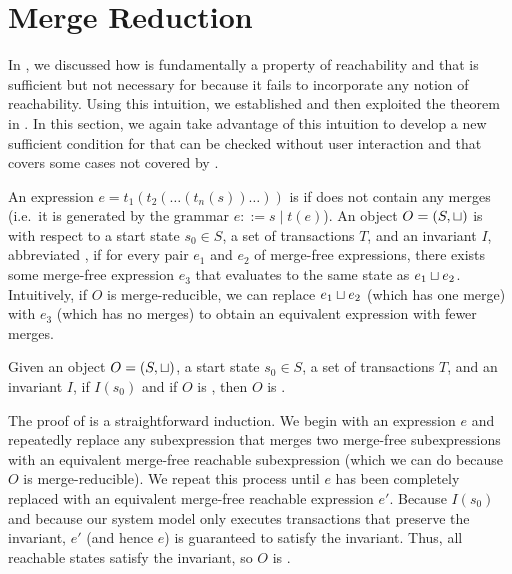\section{Merge Reduction}
In , we discussed how \invariantclosure{} is
fundamentally a property of reachability and that \invariantclosure{} is
sufficient but not necessary for \invariantconfluence{} because it fails to
incorporate any notion of reachability. Using this intuition, we established
 and then exploited the theorem in
. In this section, we again take
advantage of this intuition to develop a new sufficient condition for
\invariantconfluence{} that can be checked without user interaction and that
covers some cases not covered by \invariantclosure{}.

An expression $e = t_1(t_2(\ldots(t_n(s))\ldots))$ is  if
does not contain any merges (i.e.\ it is generated by the grammar $e ::= s \mid
t(e)$). An object $O = (S, \sqcup)$ is  with respect to
a start state $s_0 \in S$, a set of transactions $T$, and an invariant $I$,
abbreviated , if for every pair $e_1$ and $e_2$ of
merge-free \sTIreachable{} expressions, there exists some merge-free
\sTIreachable{} expression $e_3$ that evaluates to the same state as $e_1 \sqcup
e_2$. Intuitively, if $O$ is merge-reducible, we can replace $e_1 \sqcup e_2$
(which has one merge) with $e_3$ (which has no merges) to obtain an equivalent
expression with fewer merges.

\begin{theorem}
  Given an object $O = (S, \sqcup)$, a start state $s_0 \in S$, a set of
  transactions $T$, and an invariant $I$, if $I(s_0)$ and if $O$ is
  \sTImergereducible{}, then $O$ is \sTIconfluent{}.
\end{theorem}

The proof of  is a straightforward
induction. We begin with an \sTIreachable{} expression $e$ and repeatedly
replace any subexpression that merges two merge-free subexpressions with an
equivalent merge-free reachable subexpression (which we can do because $O$ is
merge-reducible). We repeat this process until $e$ has been completely replaced
with an equivalent merge-free reachable expression $e'$. Because $I(s_0)$ and
because our system model only executes transactions that preserve the
invariant, $e'$ (and hence $e$) is guaranteed to satisfy the invariant. Thus,
all reachable states satisfy the invariant, so $O$ is \invariantconfluent{}.

